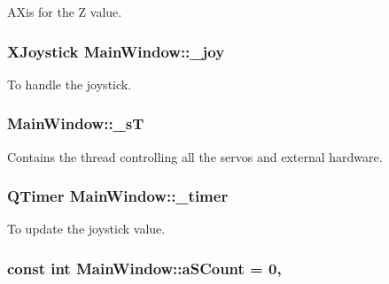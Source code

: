 A\+Xis for the Z value. 

\hypertarget{class_main_window_a671f35800890e518713e1946671d8730}{}
\subsubsection[{\+\_\+joy}]{\setlength{\rightskip}{0pt plus 5cm}X\+Joystick Main\+Window\+::\+\_\+joy\hspace{0.3cm}{\ttfamily [private]}}\label{class_main_window_a671f35800890e518713e1946671d8730}


To handle the joystick. 

\hypertarget{class_main_window_a97f8ecc7ecb930b796178cef7b975013}{}
\subsubsection[{\+\_\+s\+T}]{ Main\+Window\+::\+\_\+s\+T\hspace{0.3cm}{\ttfamily [private]}}\label{class_main_window_a97f8ecc7ecb930b796178cef7b975013}


Contains the thread controlling all the servos and external hardware. 

\hypertarget{class_main_window_a254b03b878cfda75c1c411a2f8568d33}{}
\subsubsection[{\+\_\+timer}]{\setlength{\rightskip}{0pt plus 5cm}Q\+Timer Main\+Window\+::\+\_\+timer\hspace{0.3cm}{\ttfamily [private]}}\label{class_main_window_a254b03b878cfda75c1c411a2f8568d33}


To update the joystick value. 

\hypertarget{class_main_window_a42c44af9c0eebc33f4e81f02e15b0461}{}
\subsubsection[{a\+S\+Count}]{\setlength{\rightskip}{0pt plus 5cm}const int Main\+Window\+::a\+S\+Count = 0\hspace{0.3cm}{\ttfamily [static]}, {\ttfamily [private]}}\label{class_main_window_a42c44af9c0eebc33f4e81f02e15b0461}


